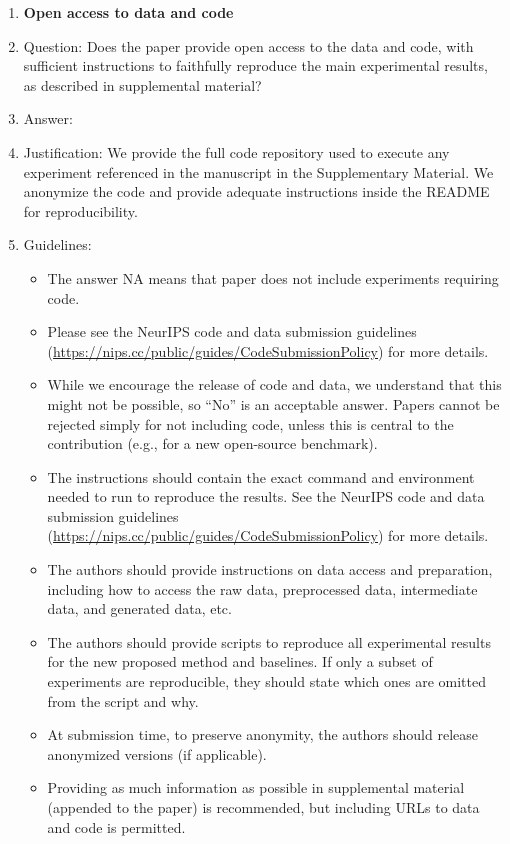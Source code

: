 \documentclass{article}
\begin{document}
\begin{enumerate}
\item {\bf Open access to data and code}
    \item[] Question: Does the paper provide open access to the data and code, with sufficient instructions to faithfully reproduce the main experimental results, as described in supplemental material?
    \item[] Answer: \answerYes{} %
    \item[] Justification: We provide the full code repository used to execute any experiment referenced in the manuscript in the Supplementary Material. We anonymize the code and provide adequate instructions inside the README for reproducibility.
    \item[] Guidelines:
    \begin{itemize}
        \item The answer NA means that paper does not include experiments requiring code.
        \item Please see the NeurIPS code and data submission guidelines (\url{https://nips.cc/public/guides/CodeSubmissionPolicy}) for more details.
        \item While we encourage the release of code and data, we understand that this might not be possible, so “No” is an acceptable answer. Papers cannot be rejected simply for not including code, unless this is central to the contribution (e.g., for a new open-source benchmark).
        \item The instructions should contain the exact command and environment needed to run to reproduce the results. See the NeurIPS code and data submission guidelines (\url{https://nips.cc/public/guides/CodeSubmissionPolicy}) for more details.
        \item The authors should provide instructions on data access and preparation, including how to access the raw data, preprocessed data, intermediate data, and generated data, etc.
        \item The authors should provide scripts to reproduce all experimental results for the new proposed method and baselines. If only a subset of experiments are reproducible, they should state which ones are omitted from the script and why.
        \item At submission time, to preserve anonymity, the authors should release anonymized versions (if applicable).
        \item Providing as much information as possible in supplemental material (appended to the paper) is recommended, but including URLs to data and code is permitted.
    \end{itemize}



\end{enumerate}
\end{document}
